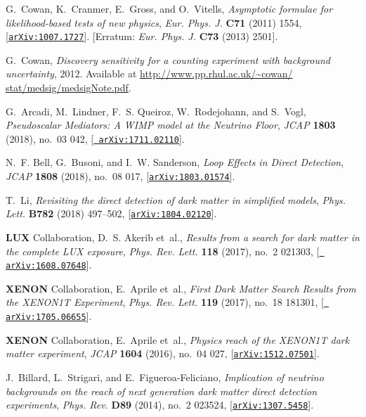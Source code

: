 \documentclass[a4paper, 11pt,notoc]{article}
\begin{document}
\begin{thebibliography}{100}
G.~Cowan, K.~Cranmer, E.~Gross, and O.~Vitells, {\it {Asymptotic formulae for
  likelihood-based tests of new physics}},  {\em Eur. Phys. J.} {\bf C71}
  (2011) 1554, [\href{http://arxiv.org/abs/1007.1727}{{\tt arXiv:1007.1727}}].
  [Erratum: {\it Eur. Phys. J.} {\bf C73} (2013) 2501].

G.~Cowan, {\it {Discovery sensitivity for a counting experiment with background
  uncertainty}},  2012.
\newblock Available at \url{http://www.pp.rhul.ac.uk/~cowan/
  stat/medsig/medsigNote.pdf}.

G.~Arcadi, M.~Lindner, F.~S. Queiroz, W.~Rodejohann, and S.~Vogl, {\it
  {Pseudoscalar Mediators: A WIMP model at the Neutrino Floor}},  {\em JCAP}
  {\bf 1803} (2018), no.~03 042, [\href{http://arxiv.org/abs/1711.02110}{{\tt
  arXiv:1711.02110}}].

N.~F. Bell, G.~Busoni, and I.~W. Sanderson, {\it {Loop Effects in Direct
  Detection}},  {\em JCAP} {\bf 1808} (2018), no.~08 017,
  [\href{http://arxiv.org/abs/1803.01574}{{\tt arXiv:1803.01574}}].

T.~Li, {\it {Revisiting the direct detection of dark matter in simplified
  models}},  {\em Phys. Lett.} {\bf B782} (2018) 497--502,
  [\href{http://arxiv.org/abs/1804.02120}{{\tt arXiv:1804.02120}}].

{\bf LUX} Collaboration, D.~S. Akerib et~al., {\it {Results from a search for
  dark matter in the complete LUX exposure}},  {\em Phys. Rev. Lett.} {\bf 118}
  (2017), no.~2 021303, [\href{http://arxiv.org/abs/1608.07648}{{\tt
  arXiv:1608.07648}}].

{\bf XENON} Collaboration, E.~Aprile et~al., {\it {First Dark Matter Search
  Results from the XENON1T Experiment}},  {\em Phys. Rev. Lett.} {\bf 119}
  (2017), no.~18 181301, [\href{http://arxiv.org/abs/1705.06655}{{\tt
  arXiv:1705.06655}}].

{\bf XENON} Collaboration, E.~Aprile et~al., {\it {Physics reach of the XENON1T
  dark matter experiment}},  {\em JCAP} {\bf 1604} (2016), no.~04 027,
  [\href{http://arxiv.org/abs/1512.07501}{{\tt arXiv:1512.07501}}].

J.~Billard, L.~Strigari, and E.~Figueroa-Feliciano, {\it {Implication of
  neutrino backgrounds on the reach of next generation dark matter direct
  detection experiments}},  {\em Phys. Rev.} {\bf D89} (2014), no.~2 023524,
  [\href{http://arxiv.org/abs/1307.5458}{{\tt arXiv:1307.5458}}].


\end{thebibliography}
\end{document}
